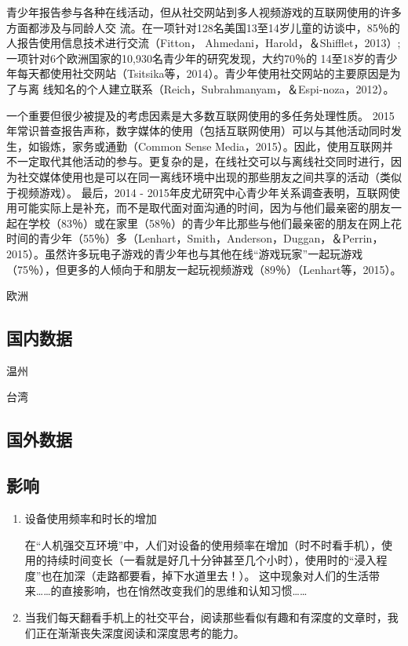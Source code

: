 青少年报告参与各种在线活动，但从社交网站到多人视频游戏的互联网使用的许多方面都涉及与同龄人交
流。在一项针对128名美国13至14岁儿童的访谈中，85％的人报告使用信息技术进行交流（Fitton，
Ahmedani，Harold，＆Shifflet，2013）;一项针对6个欧洲国家的10,930名青少年的研究发现，大约70％的
14至18岁的青少年每天都使用社交网站（Tsitsika等，2014）。青少年使用社交网站的主要原因是为了与离
线知名的个人建立联系（Reich，Subrahmanyam，＆Espi-noza，2012）。

一个重要但很少被提及的考虑因素是大多数互联网使用的多任务处理性质。 2015年常识普查报告声称，数字媒体的使用（包括互联网使用）可以与其他活动同时发生，如锻炼，家务或通勤（Common Sense Media，2015）。因此，使用互联网并不一定取代其他活动的参与。更复杂的是，在线社交可以与离线社交同时进行，因为社交媒体使用也是可以在同一离线环境中出现的那些朋友之间共享的活动（类似于视频游戏）。
最后，2014 - 2015年皮尤研究中心青少年关系调查表明，互联网使用可能实际上是补充，而不是取代面对面沟通的时间，因为与他们最亲密的朋友一起在学校（83％）或在家里（58％）的青少年比那些与他们最亲密的朋友在网上花时间的青少年（55％）多（Lenhart，Smith，Anderson，Duggan，＆Perrin，2015）。虽然许多玩电子游戏的青少年也与其他在线“游戏玩家”一起玩游戏（75％），但更多的人倾向于和朋友一起玩视频游戏（89％）（Lenhart等，2015）。

欧洲

\subsection{国内数据}

温州

台湾


\subsection{国外数据}


\subsection{影响}

\begin{enumerate}
\item 设备使用频率和时长的增加

	在“人机强交互环境”中，人们对设备的使用频率在增加（时不时看手机），使用的持续时间变长（一看就是好几十分钟甚至几个小时），使用时的“浸入程度”也在加深（走路都要看，掉下水道里去！）。
		这中现象对人们的生活带来……的直接影响，也在悄然改变我们的思维和认知习惯……
\item 当我们每天翻看手机上的社交平台，阅读那些看似有趣和有深度的文章时，我们正在渐渐丧失深度阅读和深度思考的能力。


\end{enumerate}


